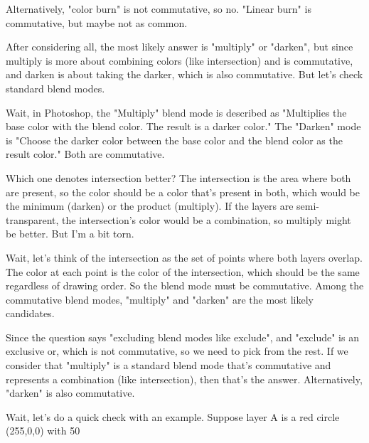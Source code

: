 Alternatively, "color burn" is not commutative, so no. "Linear burn" is commutative, but maybe not as common. 

After considering all, the most likely answer is "multiply" or "darken", but since multiply is more about combining colors (like intersection) and is commutative, and darken is about taking the darker, which is also commutative. But let's check standard blend modes. 

Wait, in Photoshop, the "Multiply" blend mode is described as "Multiplies the base color with the blend color. The result is a darker color." The "Darken" mode is "Choose the darker color between the base color and the blend color as the result color." Both are commutative. 

Which one denotes intersection better? The intersection is the area where both are present, so the color should be a color that's present in both, which would be the minimum (darken) or the product (multiply). If the layers are semi-transparent, the intersection's color would be a combination, so multiply might be better. But I'm a bit torn. 

Wait, let's think of the intersection as the set of points where both layers overlap. The color at each point is the color of the intersection, which should be the same regardless of drawing order. So the blend mode must be commutative. Among the commutative blend modes, "multiply" and "darken" are the most likely candidates. 

Since the question says "excluding blend modes like exclude", and "exclude" is an exclusive or, which is not commutative, so we need to pick from the rest. If we consider that "multiply" is a standard blend mode that's commutative and represents a combination (like intersection), then that's the answer. Alternatively, "darken" is also commutative. 

Wait, let's do a quick check with an example. Suppose layer A is a red circle (255,0,0) with 50%

